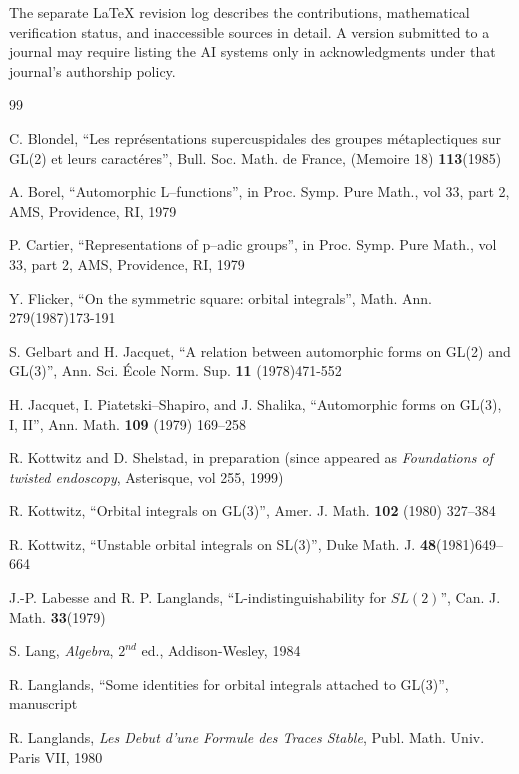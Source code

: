 \documentclass[12pt,letterpaper]{amsart}
\numberwithin{equation}{section}
\theoremstyle{definition}
\theoremstyle{plain}
\begin{document}
The separate LaTeX revision log describes the contributions,
mathematical verification status, and inaccessible sources in detail.
A version submitted to a journal may require listing the AI systems
only in acknowledgments under that journal's authorship policy.

\begin{thebibliography}{99}


C. Blondel, ``Les repr\'esentations supercuspidales des groupes 
m\'etaplectiques sur GL(2) et leurs caract\'eres'', Bull. Soc. Math. de 
France, (Memoire 18) \textbf{113}(1985)

A. Borel, ``Automorphic L--functions'', in Proc. Symp. Pure
Math., vol 33, part 2, AMS, Providence, RI, 1979

 P. Cartier, ``Representations of p--adic groups'', in Proc. 
Symp. Pure Math., vol 33, part 2, AMS, Providence, RI, 1979

 Y. Flicker, ``On the symmetric square: orbital integrals'',
Math. Ann. 279(1987)173-191

S. Gelbart and H. Jacquet, ``A relation between automorphic forms
on GL(2) and GL(3)'', Ann. Sci. \'Ecole Norm. Sup. \textbf{11}
(1978)471-552

 H. Jacquet, I. Piatetski--Shapiro, and J. Shalika,
``Automorphic forms on GL(3), I, II'', Ann. Math. \textbf{109} 
(1979) 169--258

 R. Kottwitz and D. Shelstad, in preparation
(since appeared as \emph{Foundations of twisted endoscopy}, 
Asterisque, vol 255, 1999)

 R. Kottwitz, ``Orbital integrals on GL(3)'', Amer. J. Math.
\textbf{102} (1980) 327--384

 R. Kottwitz, ``Unstable orbital integrals on SL(3)'', 
Duke Math. J. \textbf{48}(1981)649--664

 J.-P. Labesse and R. P. Langlands,
``L-indistinguishability for
$SL(2)$'', Can. J. Math. \textbf{33}(1979)

 S. Lang, \emph{Algebra}, $2^{nd}$ ed., Addison-Wesley,
1984

 R. Langlands, ``Some identities for orbital integrals 
attached to GL(3)'', manuscript

 R. Langlands, \emph{Les Debut d'une Formule des Traces
Stable}, Publ. Math. Univ. Paris VII, 1980 


\end{thebibliography}
\end{document}
